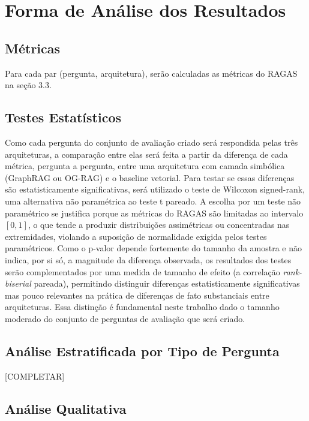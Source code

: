 \documentclass{article}
\begin{document}
\section{Forma de Análise dos Resultados}

\subsection{Métricas}

Para cada par (pergunta, arquitetura), serão calculadas as métricas do RAGAS \cite{es-etal-2024-ragas} na seção 3.3. 

\subsection{Testes Estatísticos}

Como cada pergunta do conjunto de avaliação criado será respondida pelas três arquiteturas, a comparação entre elas será feita a partir da diferença de cada métrica, pergunta a pergunta, entre uma arquitetura com camada simbólica (GraphRAG ou OG-RAG) e o baseline vetorial. Para testar se essas diferenças são estatisticamente significativas, será utilizado o teste de Wilcoxon signed-rank, uma alternativa não paramétrica ao teste t pareado. A escolha por um teste não paramétrico se justifica porque as métricas do RAGAS são limitadas ao intervalo $[0,1]$, o que tende a produzir distribuições assimétricas ou concentradas nas extremidades, violando a suposição de normalidade exigida pelos testes paramétricos. Como o p-valor depende fortemente do tamanho da amostra e não indica, por si só, a magnitude da diferença observada, os resultados dos testes serão complementados por uma medida de tamanho de efeito (a correlação \textit{rank-biserial} pareada), permitindo distinguir diferenças estatisticamente significativas mas pouco relevantes na prática de diferenças de fato substanciais entre arquiteturas. Essa distinção é fundamental neste trabalho dado o tamanho moderado do conjunto de perguntas de avaliação que será criado.

\subsection{Análise Estratificada por Tipo de Pergunta}

[COMPLETAR]

\subsection{Análise Qualitativa}
\end{document}
